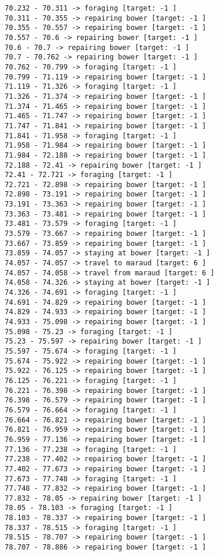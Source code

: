 \documentclass[11pt]{article}
\begin{document}
\begin{Verbatim}[commandchars=\\\{\}]
70.232 - 70.311 -> foraging [target: -1 ]
70.311 - 70.355 -> repairing bower [target: -1 ]
70.355 - 70.557 -> repairing bower [target: -1 ]
70.557 - 70.6 -> repairing bower [target: -1 ]
70.6 - 70.7 -> repairing bower [target: -1 ]
70.7 - 70.762 -> repairing bower [target: -1 ]
70.762 - 70.799 -> foraging [target: -1 ]
70.799 - 71.119 -> repairing bower [target: -1 ]
71.119 - 71.326 -> foraging [target: -1 ]
71.326 - 71.374 -> repairing bower [target: -1 ]
71.374 - 71.465 -> repairing bower [target: -1 ]
71.465 - 71.747 -> repairing bower [target: -1 ]
71.747 - 71.841 -> repairing bower [target: -1 ]
71.841 - 71.958 -> foraging [target: -1 ]
71.958 - 71.984 -> repairing bower [target: -1 ]
71.984 - 72.188 -> repairing bower [target: -1 ]
72.188 - 72.41 -> repairing bower [target: -1 ]
72.41 - 72.721 -> foraging [target: -1 ]
72.721 - 72.898 -> repairing bower [target: -1 ]
72.898 - 73.191 -> repairing bower [target: -1 ]
73.191 - 73.363 -> repairing bower [target: -1 ]
73.363 - 73.481 -> repairing bower [target: -1 ]
73.481 - 73.579 -> foraging [target: -1 ]
73.579 - 73.667 -> repairing bower [target: -1 ]
73.667 - 73.859 -> repairing bower [target: -1 ]
73.859 - 74.057 -> staying at bower [target: -1 ]
74.057 - 74.057 -> travel to maraud [target: 6 ]
74.057 - 74.058 -> travel from maraud [target: 6 ]
74.058 - 74.326 -> staying at bower [target: -1 ]
74.326 - 74.691 -> foraging [target: -1 ]
74.691 - 74.829 -> repairing bower [target: -1 ]
74.829 - 74.933 -> repairing bower [target: -1 ]
74.933 - 75.098 -> repairing bower [target: -1 ]
75.098 - 75.23 -> foraging [target: -1 ]
75.23 - 75.597 -> repairing bower [target: -1 ]
75.597 - 75.674 -> foraging [target: -1 ]
75.674 - 75.922 -> repairing bower [target: -1 ]
75.922 - 76.125 -> repairing bower [target: -1 ]
76.125 - 76.221 -> foraging [target: -1 ]
76.221 - 76.398 -> repairing bower [target: -1 ]
76.398 - 76.579 -> repairing bower [target: -1 ]
76.579 - 76.664 -> foraging [target: -1 ]
76.664 - 76.821 -> repairing bower [target: -1 ]
76.821 - 76.959 -> repairing bower [target: -1 ]
76.959 - 77.136 -> repairing bower [target: -1 ]
77.136 - 77.238 -> foraging [target: -1 ]
77.238 - 77.402 -> repairing bower [target: -1 ]
77.402 - 77.673 -> repairing bower [target: -1 ]
77.673 - 77.748 -> foraging [target: -1 ]
77.748 - 77.832 -> repairing bower [target: -1 ]
77.832 - 78.05 -> repairing bower [target: -1 ]
78.05 - 78.103 -> foraging [target: -1 ]
78.103 - 78.337 -> repairing bower [target: -1 ]
78.337 - 78.515 -> foraging [target: -1 ]
78.515 - 78.707 -> repairing bower [target: -1 ]
78.707 - 78.886 -> repairing bower [target: -1 ]

\end{Verbatim}
\end{document}
